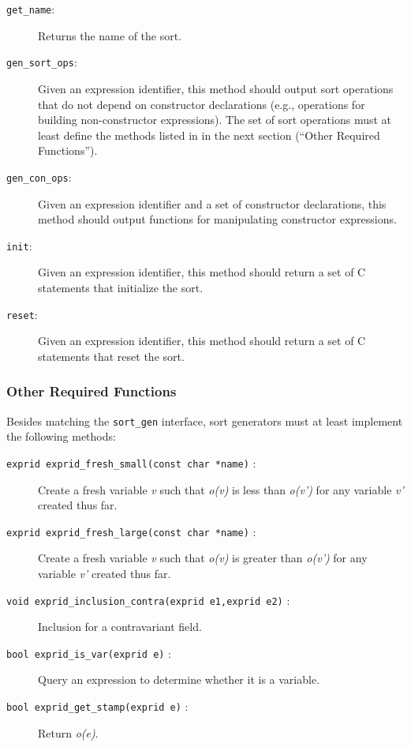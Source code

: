 \documentclass{article}
\begin{document}
\begin{description}
\item[\texttt{get\_name}:] Returns the name of the sort.
\item[\texttt{gen\_sort\_ops}:] Given an expression identifier, this method 
should output sort operations that do not depend on constructor declarations
(e.g., operations for building non-constructor expressions). The set of sort 
operations must at least define the methods listed in in the next section 
(``Other Required Functions'').
\item[\texttt{gen\_con\_ops}:] Given an expression identifier and a set of 
constructor declarations, this method should output functions for manipulating
constructor expressions.
\item[\texttt{init}:] Given an expression identifier, this method should return
a set of C statements that initialize the sort.
\item[\texttt{reset}:] Given an expression identifier, this method should 
return a set of C statements that reset the sort.
\end{description}

\subsubsection{Other Required Functions}

Besides matching the \texttt{sort\_gen} interface, sort generators must at 
least implement the following methods:

\begin{description}
\item[\texttt{exprid exprid\_fresh\_small(const char *name)} :] Create a fresh
variable \emph{v} such that \emph{o(v)} is less than \emph{o(v')} for any
variable \emph{v'} created thus far.
\item[\texttt{exprid exprid\_fresh\_large(const char *name)} :] Create a fresh
variable \emph{v} such that \emph{o(v)} is greater than \emph{o(v')} for any
variable \emph{v'} created thus far.
\item[\texttt{void exprid\_inclusion\_contra(exprid e1,exprid e2)} :] Inclusion
for a contravariant field.
\item[\texttt{bool exprid\_is\_var(exprid e)} :] Query an expression to determine whether it is a variable.
\item[\texttt{bool exprid\_get\_stamp(exprid e)} :] Return \emph{o(e)}.
\end{description}
\end{document}
